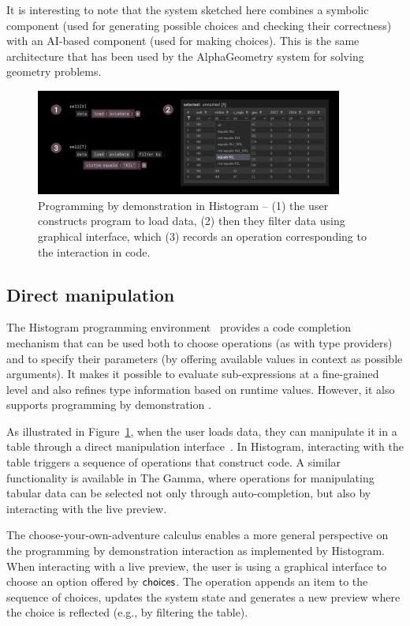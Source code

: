 \documentclass[ a4paper,UKenglish,cleveref, autoref, thm-restate]{lipics-v2021}
\newcommand{\ident}[1]{\textsf{#1}}
\newcommand{\choices}{\textnormal{\ident{choices}}}
\begin{document}
It is interesting to note that the system sketched here combines a symbolic component (used for generating
possible choices and checking their correctness) with an AI-based component (used for
making choices). This is the same architecture that has been used by the Alpha\-Geometry
system \cite{trinh-2024-alphageometry} for solving geometry problems.

\begin{figure}[t]
  \includegraphics[width=0.9\textwidth]{fig/histogram.png}
  \caption{Programming by demonstration in Histogram -- (1) the user constructs program to load
    data, (2) then they filter data using graphical interface, which (3) records an operation
    corresponding to the interaction in code.}
  \label{fig:histogram}
\end{figure}

\subsection{Direct manipulation}

The Histogram programming environment~\cite{petricek-2019-histogram} provides a code completion
mechanism that can be used both to choose operations (as with type providers) and to specify
their parameters (by offering available values in context as possible arguments). It makes it
possible to evaluate sub-expressions at a fine-grained level and also refines type information
based on runtime values. However, it also supports programming by demonstration
\cite{cypher-1993-pbd,kandel-2011-wrangler}.

As illustrated in Figure~\ref{fig:histogram}, when the user loads data, they can manipulate it
in a table through a direct manipulation interface~\cite{shneiderman-1983-direct}. In Histogram,
interacting with the table triggers a sequence of operations that construct code. A similar
functionality is available in The Gamma, where operations for manipulating tabular data can be
selected not only through auto-completion, but also by interacting with the live preview.

The choose-your-own-adventure calculus enables a more general perspective on the programming
by demonstration interaction as implemented by Histogram. When interacting with a live
preview, the user is using a graphical interface to choose an option offered by $\choices$.
The operation appends an item to the sequence of choices, updates the system state
and generates a new preview where the choice is reflected (e.g., by filtering the table).
\end{document}
